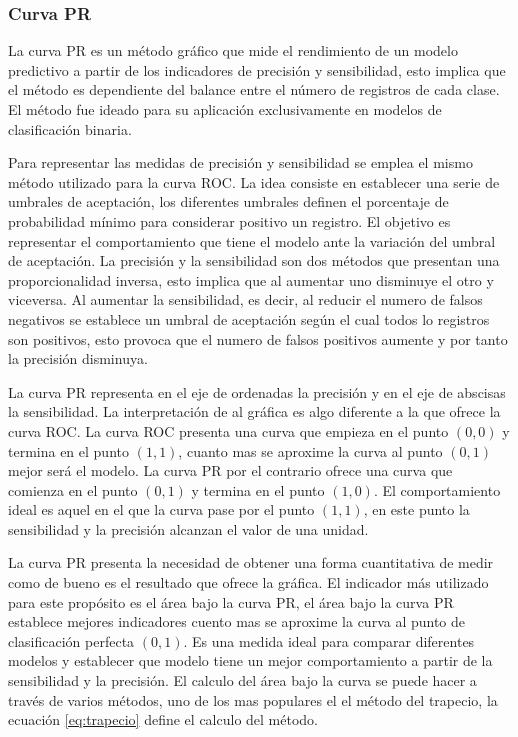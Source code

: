 \clearpage

\subsubsection{Curva PR}

La curva PR es un método gráfico que mide el rendimiento de un modelo predictivo a partir de los indicadores de precisión y sensibilidad, esto implica que el método es dependiente del balance entre el número de registros de cada clase. El método fue ideado para su aplicación exclusivamente en modelos de clasificación binaria.

\bigbreak

Para representar las medidas de precisión y sensibilidad se emplea el mismo método utilizado para la curva ROC. La idea consiste en establecer una serie de umbrales de aceptación, los diferentes umbrales definen el porcentaje de probabilidad mínimo para considerar positivo un registro. El objetivo es representar el comportamiento que tiene el modelo ante la variación  del umbral de aceptación. La precisión y la sensibilidad son dos métodos que presentan una proporcionalidad inversa, esto implica que al aumentar uno disminuye el otro y viceversa. Al aumentar la sensibilidad, es decir, al reducir el numero de falsos negativos se establece un umbral de aceptación según el cual todos lo registros son positivos, esto provoca que el numero de falsos positivos aumente y por tanto la precisión disminuya.

\bigbreak


La curva PR representa en el eje de ordenadas la precisión y en el eje de abscisas la sensibilidad. La interpretación de al gráfica es algo diferente a la que ofrece la curva ROC. La curva ROC presenta una curva que empieza en el punto $(0, 0)$ y termina en el punto $(1, 1)$, cuanto mas se aproxime la curva al punto $(0, 1)$ mejor será el modelo. La curva PR por el contrario ofrece una curva que comienza en el punto $(0, 1)$ y termina en el punto $(1, 0)$. El comportamiento ideal es aquel en el que la curva pase por el punto $(1, 1)$, en este punto la sensibilidad y la precisión alcanzan el valor de una unidad.

\bigbreak

La curva PR presenta la necesidad de obtener una forma cuantitativa de medir como de bueno es el resultado que ofrece la gráfica. El indicador más utilizado para este propósito es el área bajo la curva PR, el área bajo la curva PR establece mejores indicadores cuento mas se aproxime la curva al punto de clasificación perfecta $(0, 1)$. Es una medida ideal para comparar diferentes modelos y establecer que modelo tiene un mejor comportamiento a partir de la sensibilidad y la precisión. El calculo del área bajo la curva se puede hacer a través de varios métodos, uno de los mas populares el el método del trapecio, la ecuación \ref{eq:trapecio} define el calculo del método.


